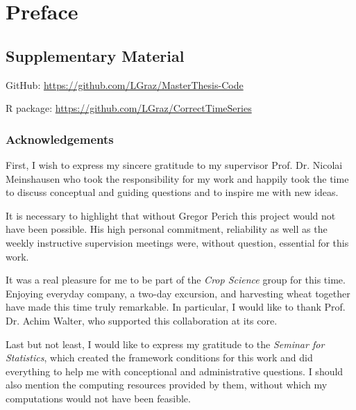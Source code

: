 \chapter*{Preface}

\section*{Supplementary Material}


GitHub: \url{https://github.com/LGraz/MasterThesis-Code} 

R package: \url{https://github.com/LGraz/CorrectTimeSeries } 


\subsection*{Acknowledgements}
First, I wish to express my sincere gratitude to my supervisor Prof. Dr. Nicolai Meinshausen who took the responsibility for my work and happily took the time to discuss conceptual and guiding questions and to inspire me with new ideas. 

It is necessary to highlight that without Gregor Perich this project would not have been possible. His high personal commitment, reliability as well as the weekly instructive supervision meetings were, without question, essential for this work. 

It was a real pleasure for me to be part of the \textit{Crop Science} group for this time. Enjoying everyday company, a two-day excursion, and harvesting wheat together have made this time truly remarkable. In particular, I would like to thank Prof. Dr. Achim Walter, who supported this collaboration at its core.  

Last but not least, I would like to express my gratitude to the \textit{Seminar for Statistics}, which created the framework conditions for this work and did everything to help me with conceptional and administrative questions. I should also mention the computing resources provided by them, without which my computations would not have been feasible.

